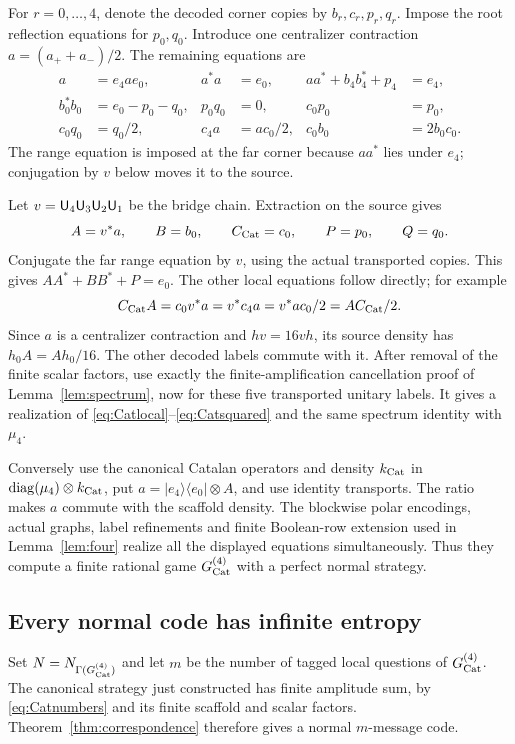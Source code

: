 For $r=0,\ldots,4$, denote the decoded corner copies by $b_r,c_r,p_r,q_r$. Impose the root reflection equations for $p_0,q_0$. Introduce one centralizer contraction $a=(a_++a_-)/2$. The remaining equations are
\begin{align}
 a&=e_4ae_0,&a^*a&=e_0,&aa^*+b_4b_4^*+p_4&=e_4,\label{eq:Catasm1}\\
 b_0^*b_0&=e_0-p_0-q_0,&p_0q_0&=0,&c_0p_0&=p_0,\label{eq:Catasm2}\\
 c_0q_0&=q_0/2,&c_4a&=ac_0/2,&c_0b_0&=2b_0c_0.\label{eq:Catasm3}
\end{align}
The range equation is imposed at the far corner because $aa^*$ lies under $e_4$; conjugation by $v$ below moves it to the source.

Let $v={\mathsf U}_4{\mathsf U}_3{\mathsf U}_2{\mathsf U}_1$ be the bridge chain. Extraction on the source gives
\[
 A=v^*a,\qquad B=b_0,\qquad C_{\mathrm{Cat}}=c_0,\qquad P=p_0,\qquad Q=q_0.
\]
Conjugate the far range equation by $v$, using the actual transported copies. This gives $AA^*+BB^*+P=e_0$. The other local equations follow directly; for example
\[
 C_{\mathrm{Cat}} A=c_0v^*a=v^*c_4a=v^*ac_0/2=AC_{\mathrm{Cat}}/2.
\]
Since $a$ is a centralizer contraction and $hv=16vh$, its source density has $h_0A=Ah_0/16$. The other decoded labels commute with it. After removal of the finite scalar factors, use exactly the finite-amplification cancellation proof of Lemma~\ref{lem:spectrum}, now for these five transported unitary labels. It gives a realization of \eqref{eq:Catlocal}--\eqref{eq:Catsquared} and the same spectrum identity with $\mu_4$.

Conversely use the canonical Catalan operators and density $k_{\mathrm{Cat}}$ in $\operatorname{diag}(\mu_4)\otimes k_{\mathrm{Cat}}$, put $a=|e_4\rangle\langle e_0|\otimes A$, and use identity transports. The ratio makes $a$ commute with the scaffold density. The blockwise polar encodings, actual graphs, label refinements and finite Boolean-row extension used in Lemma~\ref{lem:four} realize all the displayed equations simultaneously. Thus they compute a finite rational game $G^{(4)}_{\operatorname{Cat}}$ with a perfect normal strategy.

\subsection{Every normal code has infinite entropy}
Set $N=N_{\Gamma(G^{(4)}_{\operatorname{Cat}})}$ and let $m$ be the number of tagged local questions of $G^{(4)}_{\operatorname{Cat}}$. The canonical strategy just constructed has finite amplitude sum, by \eqref{eq:Catnumbers} and its finite scaffold and scalar factors. Theorem~\ref{thm:correspondence} therefore gives a normal $m$-message code.

